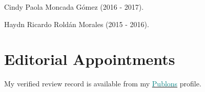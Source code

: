 \documentclass[11pt, a4paper]{awesome-cv}
\begin{document}
\begin{cventries}
{\begin{cvitems}
\item Cindy Paola Moncada Gómez (2016 - 2017).
\item Haydn Ricardo Roldán Morales (2015 - 2016).
\end{cvitems}}
\end{cventries}

\hypertarget{editorial-appointments}{%
\section{Editorial Appointments}\label{editorial-appointments}}

My verified review record is available from my
\href{https://publons.com/researcher/1333339/juan-david-leongomez/}{\textcolor{teal}{Publons}}
profile.
\end{document}
